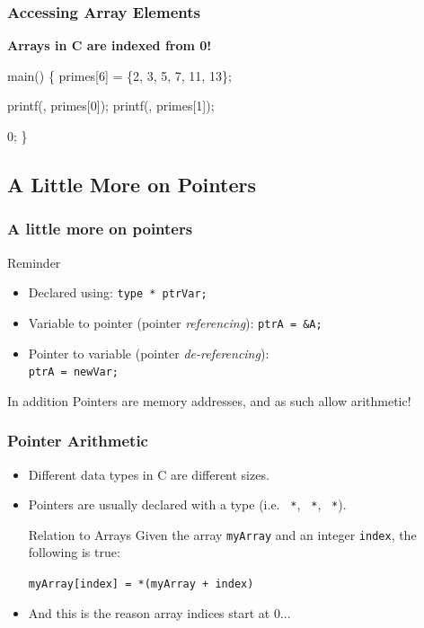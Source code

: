 \documentclass[smaller,handout,table]{beamer}
\begin{document}
\begin{frame}[fragile]
\frametitle{Accessing Array Elements}
\begin{alertblock}{}
\begin{center}
\bf Arrays in C are indexed from 0!
\end{center}
\end{alertblock}
\begin{semiverbatim}
 

 main()
\{
    primes[6] = \{2, 3, 5, 7, 11, 13\};

   printf(, primes[0]);
   printf(, primes[1]);
   
    0;   
\}
\end{semiverbatim}
\end{frame}

\subsection{A Little More on Pointers}
\begin{frame}
\frametitle{A little more on pointers}
\begin{block}{Reminder}
\begin{itemize}
\item Declared using: {\tt type * ptrVar;}
\item Variable to pointer (pointer \emph{referencing}): {\tt ptrA = \&A;}
\item Pointer to variable (pointer \emph{de-referencing}):\\ {\tt *ptrA = newVar;}
\end{itemize}
\end{block}
\begin{exampleblock}{In addition}
Pointers are memory addresses, and as such allow arithmetic!
\end{exampleblock}
\end{frame}

\begin{frame}[fragile]
\frametitle{Pointer Arithmetic}
\begin{itemize}
\item Different data types in C are different sizes.
\item Pointers are usually declared with a type (i.e. {\tt {} *},
{\tt {} *}, {\tt {} *}).

\begin{alertblock}{Relation to Arrays}
Given the array {\tt myArray} and an integer {\tt index}, the following is true:
\begin{center}
\tt myArray[index] = *(myArray + index)
\end{center}
\end{alertblock}

\item And this is the reason array indices start at 0...
\end{itemize}

\end{frame}
\end{document}
